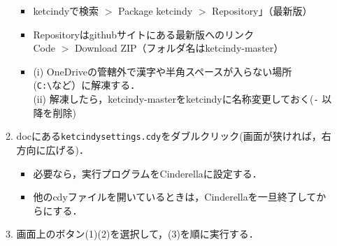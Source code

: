 \documentclass{ujarticle}
\begin{document}
\begin{enumerate}[\bf\large 1.]
\begin{enumerate}[(1)]
\begin{itemize}
     \item ketcindyで検索 $>$ Package ketcindy $>$ {\color{red}Repository}」（最新版）
     \item Repositoryはgithubサイトにある{\color{red}最新版}へのリンク\\
        \hspace*{10mm}Code $>$ Download ZIP（フォルダ名はketcindy-master）
     \item {}(i) {\color{red}OneDriveの管轄外で漢字や半角スペースが入らない場所(\verb|C:\|など）}に解凍する．\\
(ii) 解凍したら，{\color{red}ketcindy-masterをketcindyに名称変更しておく(\verb|-| 以降を削除)}
     \end{itemize}
\item docにある\verb|ketcindysettings.cdy|をダブルクリック(画面が狭ければ，右方向に広げる)．
    \begin{itemize}
    \item 必要なら，実行プログラムをCinderellaに設定する．
    \item 他のcdyファイルを開いているときは，Cinderellaを一旦終了してからにする．

   \end{itemize}
  \item 画面上のボタン(1)(2)を選択して，(3)を順に実行する．
  \end{enumerate}



\end{enumerate}
\end{document}
